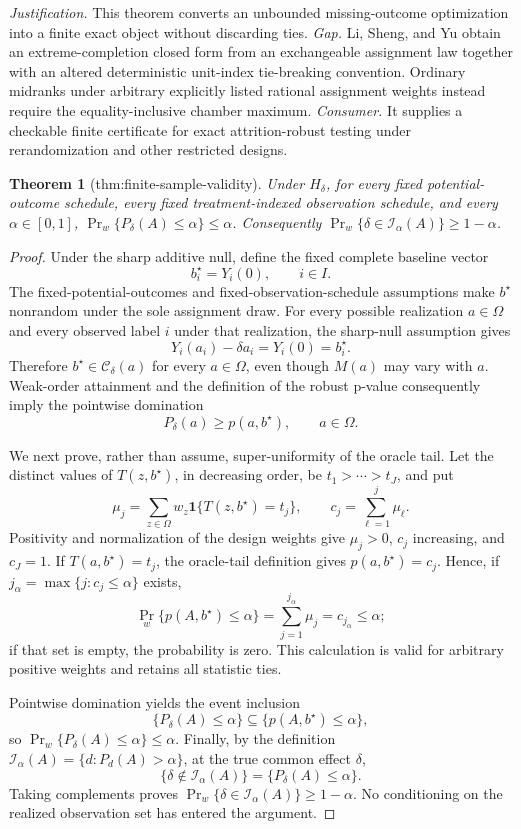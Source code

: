 \documentclass{article}
\newtheorem{theorem}{Theorem}
\begin{document}
\par\smallskip\noindent \textit{Justification.} This theorem converts an unbounded missing-outcome optimization into a finite exact object without discarding ties. \textit{Gap.} Li, Sheng, and Yu obtain an extreme-completion closed form from an exchangeable assignment law together with an altered deterministic unit-index tie-breaking convention. Ordinary midranks under arbitrary explicitly listed rational assignment weights instead require the equality-inclusive chamber maximum. \textit{Consumer.} It supplies a checkable finite certificate for exact attrition-robust testing under rerandomization and other restricted designs.

\begin{theorem}[thm:finite-sample-validity]\label{thm:finite-sample-validity}
Under \(H_\delta\), for every fixed potential-outcome schedule, every fixed treatment-indexed observation schedule, and every \(\alpha\in[0,1]\), \(\Pr_w\{P_\delta(A)\le\alpha\}\le\alpha\). Consequently \(\Pr_w\{\delta\in\mathcal I_\alpha(A)\}\ge1-\alpha\).
\end{theorem}
\begin{proof}
Under the sharp additive null, define the fixed complete baseline vector
\[
b_i^\star=Y_i(0),\qquad i\in I.
\]
The fixed-potential-outcomes and fixed-observation-schedule assumptions make \(b^\star\) nonrandom under the sole assignment draw.  For every possible realization \(a\in\Omega\) and every observed label \(i\) under that realization, the sharp-null assumption gives
\[
Y_i(a_i)-\delta a_i=Y_i(0)=b_i^\star.
\]
Therefore \(b^\star\in\mathcal C_\delta(a)\) for every \(a\in\Omega\), even though \(M(a)\) may vary with \(a\).  Weak-order attainment and the definition of the robust p-value consequently imply the pointwise domination
\[
P_\delta(a)\ge p(a,b^\star),\qquad a\in\Omega.
\]

We next prove, rather than assume, super-uniformity of the oracle tail.  Let the distinct values of \(T(z,b^\star)\), in decreasing order, be \(t_1>\cdots>t_J\), and put
\[
\mu_j=\sum_{z\in\Omega}w_z\mathbf 1\{T(z,b^\star)=t_j\},
\qquad
c_j=\sum_{\ell=1}^j\mu_\ell.
\]
Positivity and normalization of the design weights give \(\mu_j>0\), \(c_j\) increasing, and \(c_J=1\).  If \(T(a,b^\star)=t_j\), the oracle-tail definition gives \(p(a,b^\star)=c_j\).  Hence, if \(j_\alpha=\max\{j:c_j\le\alpha\}\) exists,
\[
\Pr_w\{p(A,b^\star)\le\alpha\}
=\sum_{j=1}^{j_\alpha}\mu_j
=c_{j_\alpha}\le\alpha;
\]
if that set is empty, the probability is zero.  This calculation is valid for arbitrary positive weights and retains all statistic ties.

Pointwise domination yields the event inclusion
\[
\{P_\delta(A)\le\alpha\}
\subseteq
\{p(A,b^\star)\le\alpha\},
\]
so \(\Pr_w\{P_\delta(A)\le\alpha\}\le\alpha\).  Finally, by the definition \(\mathcal I_\alpha(A)=\{d:P_d(A)>\alpha\}\), at the true common effect \(\delta\),
\[
\{\delta\notin\mathcal I_\alpha(A)\}
=\{P_\delta(A)\le\alpha\}.
\]
Taking complements proves \(\Pr_w\{\delta\in\mathcal I_\alpha(A)\}\ge1-\alpha\).  No conditioning on the realized observation set has entered the argument.
\end{proof}
\end{document}
